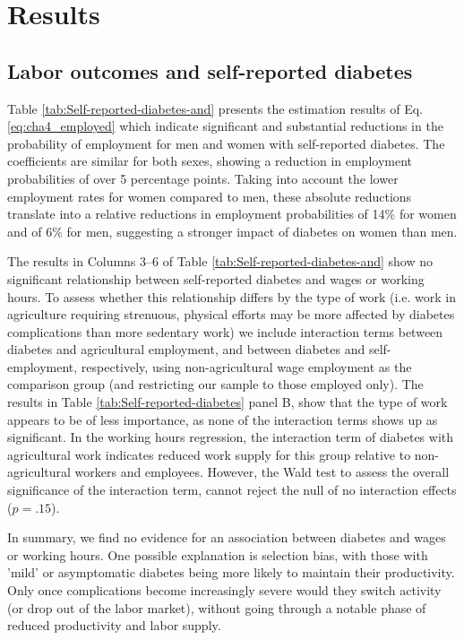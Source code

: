 \documentclass[12pt,english]{article}
\begin{document}
\section{\label{sec:cha_4_results}Results}


\subsection{Labor outcomes and self-reported diabetes}

Table \ref{tab:Self-reported-diabetes-and} presents the estimation results of Eq. \ref{eq:cha4_employed} which indicate significant and substantial reductions in the probability of employment for men and women with self-reported diabetes. The coefficients are similar for both sexes, showing a reduction in employment probabilities of over 5 percentage points. Taking into account the lower employment rates for women compared to men, these absolute reductions translate into a relative reductions in employment probabilities of 14\% for women and of 6\% for men, suggesting a stronger impact of diabetes on women than men.

The results in Columns 3--6 of Table \ref{tab:Self-reported-diabetes-and} show no significant relationship between self-reported diabetes and wages or working hours. To assess whether this relationship differs by the type of work (i.e. work in agriculture requiring strenuous, physical efforts may be more affected by diabetes complications than more sedentary work) we include interaction terms between diabetes and agricultural employment, and between diabetes and self-employment, respectively, using non-agricultural wage employment as the comparison group (and restricting our sample to those employed only). The results in Table \ref{tab:Self-reported-diabetes} panel B, show that the type of work appears to be of less importance, as none of the interaction terms shows up as significant. In the working hours regression, the interaction term of diabetes with agricultural work indicates reduced work supply for this group relative to non-agricultural workers and employees. However, the Wald test to assess the overall significance of the interaction term, cannot  reject the null of no interaction effects ($p = .15$).

In summary, we find no evidence for an association between diabetes and wages or working hours. One possible explanation is selection bias, with those with 'mild' or asymptomatic diabetes being more likely to maintain their productivity. Only once complications become increasingly severe would they switch activity (or drop out of the labor market), without going through a notable phase of reduced productivity and labor supply.
\end{document}
